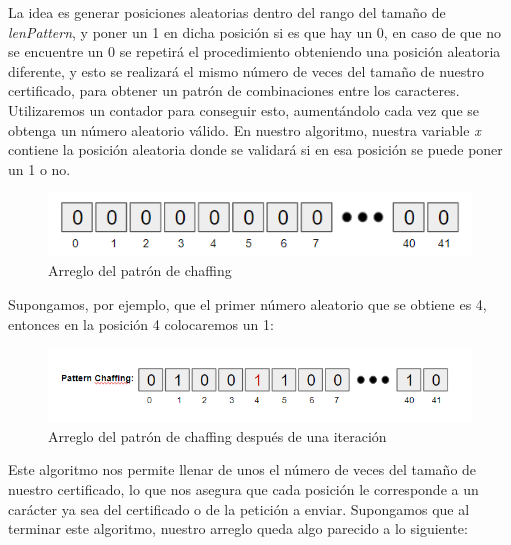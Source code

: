 \documentclass[12pt, a4paper, titlepage]{report}
\begin{document}
		    La idea es generar posiciones aleatorias dentro del rango del tamaño de \textit{lenPattern}, y poner un 1 en dicha posición si es que hay un 0, en caso de que no se encuentre un 0 se repetirá el procedimiento obteniendo una posición aleatoria diferente, y esto se realizará el mismo número de veces del tamaño de nuestro certificado, para obtener un patrón de combinaciones entre los caracteres. Utilizaremos un contador para conseguir esto, aumentándolo cada vez que se obtenga un número aleatorio válido. En nuestro algoritmo, nuestra variable \textit{x} contiene la posición aleatoria donde se validará si en esa posición se puede poner un 1 o no.\\
		    
		    \begin{figure}[H]
    			\begin{center}	                  \includegraphics[width=14cm]{./imagenes/Desarrollo/Prototipo_2/algorithm1_1.png}
				\caption{Arreglo del patrón de chaffing}
    			\end{center}
    		\end{figure}
        	
		    Supongamos, por ejemplo, que el primer número aleatorio que se obtiene es 4, entonces en la posición 4 colocaremos un 1: 
		    
		    \begin{figure}[H]
    			\begin{center}	                  \includegraphics[width=14cm]{./imagenes/Desarrollo/Prototipo_2/algorithm1_2.png}
				\caption{Arreglo del patrón de chaffing después de una iteración}
    			\end{center}
    		\end{figure}
    		
    		Este algoritmo nos permite llenar de unos el número de veces del tamaño de nuestro certificado, lo que nos asegura que cada posición le corresponde a un carácter ya sea del certificado o de la petición a enviar. Supongamos que al terminar este algoritmo, nuestro arreglo queda algo parecido a lo siguiente:
    		
\end{document}
